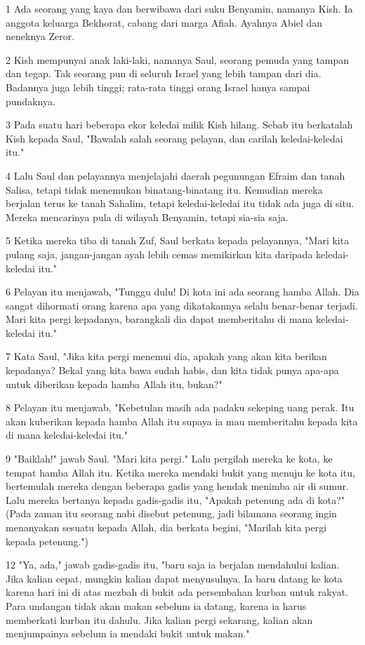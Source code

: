 \par 1 Ada seorang yang kaya dan berwibawa dari suku Benyamin, namanya Kish. Ia anggota keluarga Bekhorat, cabang dari marga Afiah. Ayahnya Abiel dan neneknya Zeror.
\par 2 Kish mempunyai anak laki-laki, namanya Saul, seorang pemuda yang tampan dan tegap. Tak seorang pun di seluruh Israel yang lebih tampan dari dia. Badannya juga lebih tinggi; rata-rata tinggi orang Israel hanya sampai pundaknya.
\par 3 Pada suatu hari beberapa ekor keledai milik Kish hilang. Sebab itu berkatalah Kish kepada Saul, "Bawalah salah seorang pelayan, dan carilah keledai-keledai itu."
\par 4 Lalu Saul dan pelayannya menjelajahi daerah pegunungan Efraim dan tanah Salisa, tetapi tidak menemukan binatang-binatang itu. Kemudian mereka berjalan terus ke tanah Sahalim, tetapi keledai-keledai itu tidak ada juga di situ. Mereka mencarinya pula di wilayah Benyamin, tetapi sia-sia saja.
\par 5 Ketika mereka tiba di tanah Zuf, Saul berkata kepada pelayannya, "Mari kita pulang saja, jangan-jangan ayah lebih cemas memikirkan kita daripada keledai-keledai itu."
\par 6 Pelayan itu menjawab, "Tunggu dulu! Di kota ini ada seorang hamba Allah. Dia sangat dihormati orang karena apa yang dikatakannya selalu benar-benar terjadi. Mari kita pergi kepadanya, barangkali dia dapat memberitahu di mana keledai-keledai itu."
\par 7 Kata Saul, "Jika kita pergi menemui dia, apakah yang akan kita berikan kepadanya? Bekal yang kita bawa sudah habis, dan kita tidak punya apa-apa untuk diberikan kepada hamba Allah itu, bukan?"
\par 8 Pelayan itu menjawab, "Kebetulan masih ada padaku sekeping uang perak. Itu akan kuberikan kepada hamba Allah itu supaya ia mau memberitahu kepada kita di mana keledai-keledai itu."
\par 9 "Baiklah!" jawab Saul. "Mari kita pergi." Lalu pergilah mereka ke kota, ke tempat hamba Allah itu. Ketika mereka mendaki bukit yang menuju ke kota itu, bertemulah mereka dengan beberapa gadis yang hendak menimba air di sumur. Lalu mereka bertanya kepada gadis-gadis itu, "Apakah petenung ada di kota?" (Pada zaman itu seorang nabi disebut petenung, jadi bilamana seorang ingin menanyakan sesuatu kepada Allah, dia berkata begini, "Marilah kita pergi kepada petenung.")
\par 12 "Ya, ada," jawab gadis-gadis itu, "baru saja ia berjalan mendahului kalian. Jika kalian cepat, mungkin kalian dapat menyusulnya. Ia baru datang ke kota karena hari ini di atas mezbah di bukit ada persembahan kurban untuk rakyat. Para undangan tidak akan makan sebelum ia datang, karena ia harus memberkati kurban itu dahulu. Jika kalian pergi sekarang, kalian akan menjumpainya sebelum ia mendaki bukit untuk makan."
